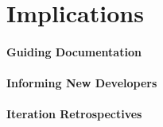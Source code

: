 \chapter{Implications} %
\label{cha:implications}

\subsubsection{Guiding Documentation} %
\label{ssub:guiding_documentation}


\subsubsection{Informing New Developers} %
\label{ssub:informing_new_developers}


\subsubsection{Iteration Retrospectives} %
\label{ssub:iteration_retrospectives}


